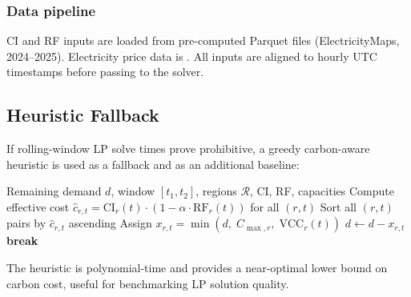 \subsubsection*{Data pipeline}
CI and RF inputs are loaded from pre-computed Parquet files (ElectricityMaps, 2024--2025).
Electricity price data is .
All inputs are aligned to hourly UTC timestamps before passing to the solver.

\subsection{Heuristic Fallback}

If rolling-window LP solve times prove prohibitive, a greedy carbon-aware heuristic is used as a fallback and as an additional baseline:

\begin{algorithm}
\caption{Greedy Carbon-Aware Shifting}
\begin{algorithmic}[1]
\REQUIRE Remaining demand $d$, window $[t_1, t_2]$, regions $\mathcal{R}$, CI, RF, capacities
\STATE Compute effective cost $\hat{c}_{r,t} = \mathrm{CI}_r(t) \cdot (1 - \alpha \cdot \mathrm{RF}_r(t))$ for all $(r, t)$
\STATE Sort all $(r, t)$ pairs by $\hat{c}_{r,t}$ ascending
  \STATE Assign $x_{r,t} = \min(d,\; C_{\max,r},\; \mathrm{VCC}_r(t))$
  \STATE $d \leftarrow d - x_{r,t}$
   \STATE \textbf{break} \ENDIF
\ENDFOR
\end{algorithmic}
\end{algorithm}

The heuristic is polynomial-time and provides a near-optimal lower bound on carbon cost, useful for benchmarking LP solution quality.
